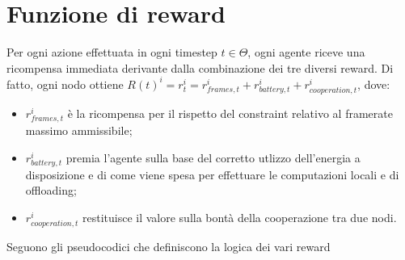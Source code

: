 \documentclass{article}
\begin{document}
\section{Funzione di reward}
Per ogni azione effettuata in ogni timestep $t \in \Theta$, ogni agente riceve una ricompensa immediata derivante dalla combinazione dei tre diversi reward. Di fatto, ogni nodo  ottiene $R(t)^i = r_t^i = r_{frames, t}^i + r_{battery, t}^i + r_{cooperation, t}^i$, dove:

\begin{itemize}
    \item $r_{frames, t}^i$ è la ricompensa per il rispetto del constraint relativo al framerate massimo ammissibile;
    \item $r_{battery, t}^i$ premia l'agente sulla base del corretto utlizzo dell'energia a disposizione e di come viene spesa per effettuare le computazioni locali e di offloading;
    \item $r_{cooperation, t}^i$ restituisce il valore sulla bontà della cooperazione tra due nodi.
\end{itemize}
Seguono gli pseudocodici che definiscono la logica dei vari reward

\begin{algorithm}
    \caption{Algoritmo per ricompensa per gestione delle frame, $r_{frames, t}^i$}\label{alg:cap}
    \begin{algoerithmic}
    \Else
    \EndIf
    \end{algoerithmic}
\end{algorithm}
\end{document}
